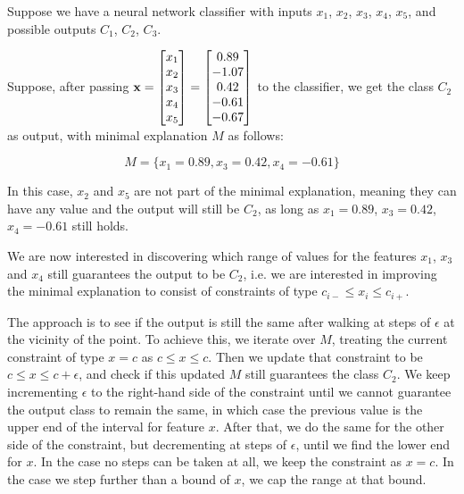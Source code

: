 \documentclass[12pt]{article}
\begin{document}


Suppose we have a neural network classifier with inputs $x_1$, $x_2$, $x_3$, $x_4$, $x_5$, and possible outputs $C_1$, $C_2$, $C_3$.

Suppose, after passing $\vb{x} = \begin{bmatrix} x_1 \\ x_2 \\ x_3 \\ x_4 \\ x_5 \end{bmatrix} = \begin{bmatrix} 0.89 \\ -1.07 \\ 0.42 \\ -0.61 \\ -0.67 \end{bmatrix}$ to the classifier, we get the class $C_2$ as output, with minimal explanation $M$ as follows:

\[
M = \{x_1 = 0.89, x_3 = 0.42, x_4 = -0.61\}
\]

In this case, $x_2$ and $x_5$ are not part of the minimal explanation, meaning they can have any value and the output will still be $C_2$, as long as $x_1 = 0.89$, $x_3 = 0.42$, $x_4 = -0.61$ still holds.

We are now interested in discovering which range of values for the features $x_1$, $x_3$ and $x_4$ still guarantees the output to be $C_2$, i.e. we are interested in improving the minimal explanation to consist of constraints of type $c_{i-} \le x_i \le c_{i+}$.

The approach is to see if the output is still the same after walking at steps of $\epsilon$ at the vicinity of the point.
To achieve this, we iterate over $M$, treating the current constraint of type $x = c$ as $c \le x \le c$.
Then we update that constraint to be $c \le x \le c + \epsilon$, and check if this updated $M$ still guarantees the class $C_2$.
We keep incrementing $\epsilon$ to the right-hand side of the constraint until we cannot guarantee the output class to remain the same, in which case the previous value is the upper end of the interval for feature $x$.
After that, we do the same for the other side of the constraint, but decrementing at steps of $\epsilon$, until we find the lower end for $x$.
In the case no steps can be taken at all, we keep the constraint as $x = c$.
In the case we step further than a bound of $x$, we cap the range at that bound.
\end{document}
